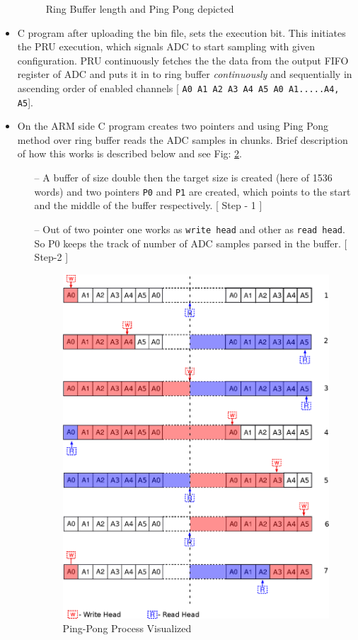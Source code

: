 \begin{itemize}
\begin{figure}[h]
		\caption{Ring Buffer length and Ping Pong depicted}
		\label{fig:rb_pp}
	\end{figure}
	\item C program after uploading the bin file, sets the execution bit. This initiates the PRU execution, which signals ADC to start sampling with given configuration. PRU continuously fetches the the data from the output FIFO register of ADC and puts it in to ring buffer \textit{continuously} and sequentially in ascending order of enabled channels [ \texttt{A0 A1 A2 A3 A4 A5 A0 A1.....A4, A5}].
	\item On the ARM side C program creates two pointers and using Ping Pong method over ring buffer reads the ADC samples in chunks. Brief description of how this works is described below and see Fig: \ref{fig:ping_pong}.
	\begin{itemize}
		\item[--] A buffer of size double then the target size is created (here of 1536 words) and two pointers  \texttt{P0} and \texttt{P1} are created, which points to the start and the middle of the buffer respectively. [ Step - 1 ]
		\item[--] Out of two pointer one works as \texttt{write head} and other as \texttt{read head}. So P0 keeps the track of number of ADC samples parsed in the buffer. [ Step-2 ]
		
		
		\begin{figure}
			\includegraphics[width=\textwidth]{fig/ping_pong.eps}
			\caption{Ping-Pong Process Visualized}
			\label{fig:ping_pong}
		\end{figure}
		

\end{itemize}
\end{itemize}
